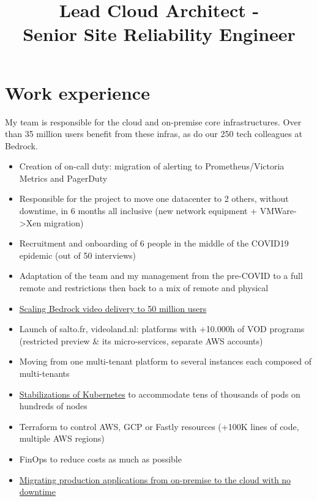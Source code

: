 \documentclass[12pt,a4paper,roman]{moderncv}          %
\title{Lead Cloud Architect -\\
Senior Site Reliability Engineer}
\begin{document}
\makecvtitle


\section{Work experience}

{My team is responsible for the cloud and on-premise core infrastructures. Over than 35 million users benefit from these infras, as do our 250 tech colleagues at Bedrock.
\begin{itemize}
  \item Creation of on-call duty: migration of alerting to Prometheus/Victoria Metrics and PagerDuty
  \item Responsible for the project to move one datacenter to 2 others, without downtime, in 6 months all inclusive (new network equipment + VMWare->Xen migration)
  \item Recruitment and onboarding of 6 people in the middle of the COVID19 epidemic (out of 50 interviews)
  \item Adaptation of the team and my management from the pre-COVID to a full remote and restrictions then back to a mix of remote and physical
  \item \href{https://tech.bedrockstreaming.com/scaling-bedrock-video-delivery-to-50-million-users/}{\color{blue}Scaling Bedrock video delivery to 50 million users}
  \item Launch of salto.fr, videoland.nl: platforms with +10.000h of VOD programs (restricted preview \& its micro-services, separate AWS accounts)
  \item Moving from one multi-tenant platform to several instances each composed of multi-tenants
  \item \href{https://tech.bedrockstreaming.com/Three-years-running-kubernetes-on-production-at-Bedrock/}{\color{blue}Stabilizations of Kubernetes} to accommodate tens of thousands of pods on hundreds of nodes
  \item Terraform to control AWS, GCP or Fastly resources (+100K lines of code, multiple AWS regions)
  \item FinOps to reduce costs as much as possible
  \item \href{https://tech.bedrockstreaming.com/Migrating-production-apps-from-on-premise-to-the-cloud-with-no-downtime/}{\color{blue}Migrating production applications from on-premise to the cloud with no downtime}
\end{itemize}}
\end{document}
